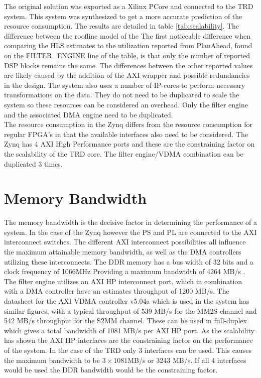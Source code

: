 

The original solution was exported as a Xilinx PCore and connected to the TRD system. This system was synthesized to get a more accurate prediction of the resource consumption. The results are detailed in table \ref{tab:scalability}. The difference between the roofline model of the The first noticeable difference when comparing the HLS estimates to the utilization reported from PlanAhead, found on the FILTER\_ENGINE line of the table, is that only the number of reported DSP blocks remains the same. The differences between the other reported values are likely caused by the addition of the AXI wrapper and possible redundancies in the design. The system also uses a number of IP-cores to perform necessary transformations on the data. They do not need to be duplicated to scale the system so these resources can be considered an overhead. Only the filter engine and the associated DMA engine need to be duplicated.\\
The resource consumption in the Zynq differs from the resource consumption for regular FPGA's in that the available interfaces also need to be considered. The Zynq has 4 AXI High Performance ports and these are the constraining factor on the scalability of the TRD core. The filter engine/VDMA combination can be duplicated 3 times. 



\section{Memory Bandwidth}

The memory bandwidth is the decisive factor in determining the performance of a system. In the case of the Zynq however the PS and PL are connected to the AXI interconnect switches. The different AXI interconnect possibilities all influence the maximum attainable memory bandwidth, as well as the DMA controllers utilizing these interconnects. The DDR memory has a bus width of 32 bits and a clock frequency of 1066MHz Providing a maximum bandwidth of 4264 MB/s \cite{anon._zynq-7000_2013}. The filter engine utilizes an AXI HP interconnect port, which in combination with a DMA controller have an estimates throughput of 1200 MB/s. The datasheet for the AXI VDMA controller v5.04a which is used in the system has similar figures, with a typical throughput of 539 MB/s for the MM2S channel and 542 MB/s throughput for the S2MM channel. These can be used in full-duplex which gives a total bandwidth of 1081 MB/s per AXI HP port\cite{axivdma}.
As the scalability has shown the AXI HP interfaces are the constraining factor on the performance of the system. In the case of the TRD only 3 interfaces can be used. This causes the maximum bandwidth to be $3 \times 1081$MB/s or 3243 MB/s. If all 4 interfaces would be used the DDR bandwidth would be the constraining factor.

